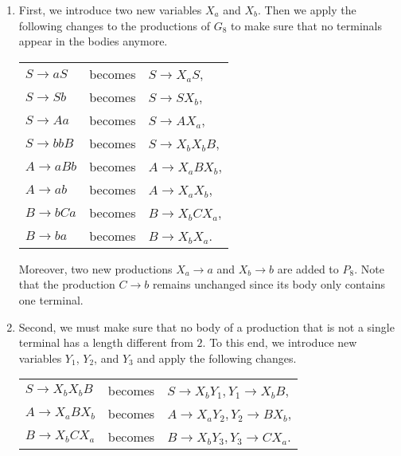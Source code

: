 \documentclass{exercise}
\begin{document}
  \begin{solution}
    \begin{enumerate}[label=\Roman*.]
      \item First, we introduce two new variables $X_a$ and $X_b$.
        Then we apply the following changes to the productions of $G_8$
        to make sure that no terminals appear in the bodies anymore.
      
        \begin{center}
          \begin{tabular}{lcl}
            $S \to aS$  & becomes & $S \to X_a S$,  \\
            $S \to Sb$  & becomes & $S \to SX_b$,   \\
            $S \to Aa$  & becomes & $S \to AX_a$,   \\
            $S \to bbB$ & becomes & $S \to X_bX_bB$,\\
            $A \to aBb$ & becomes & $A \to X_aBX_b$,\\
            $A \to ab$  & becomes & $A \to X_aX_b$, \\
            $B \to bCa$ & becomes & $B \to X_bCX_a$,\\
            $B \to ba$  & becomes & $B \to X_bX_a$.
          \end{tabular}
        \end{center}
    
        Moreover, two new productions $X_a \to a$ and $X_b \to b$ are added to $P_8$.
        Note that the production $C\to b$ remains unchanged since its body
        only contains one terminal.
      \item Second, we must make sure that no body of a production that is not a single
        terminal has a length different from $2$.  To this end, we introduce new
        variables $Y_1$, $Y_2$, and $Y_3$ and apply the following changes.
  
        \begin{center}
          \begin{tabular}{lcl}
            $S \to X_bX_bB$ & becomes & $S \to X_bY_1, Y_1 \to X_bB$,\\
            $A \to X_aBX_b$ & becomes & $A \to X_aY_2, Y_2 \to BX_b$,\\
            $B \to X_bCX_a$ & becomes & $B \to X_bY_3, Y_3 \to CX_a$.
          \end{tabular}
        \end{center}
  

\end{enumerate}
\end{solution}
\end{document}
